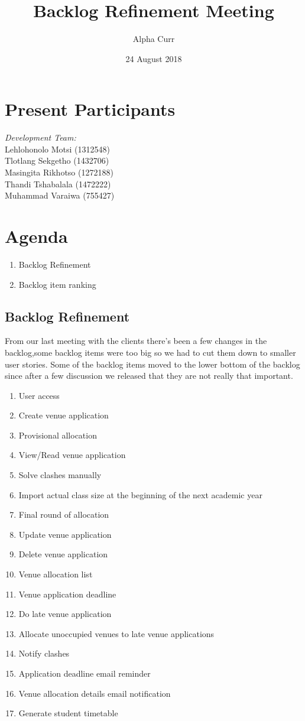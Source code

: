 \documentclass[11pt]{article}
\title{Backlog Refinement Meeting}
\author{Alpha Curr}
\date{24 August 2018}
\begin{document}
\maketitle

\section{Present Participants}
\textit{Development Team:}\\
Lehlohonolo Motsi (1312548)\\
Tlotlang Sekgetho (1432706)\\
Masingita Rikhotso (1272188)\\
Thandi Tshabalala (1472222)\\
Muhammad Varaiwa (755427)

\section{Agenda}
\begin{enumerate}
\item Backlog Refinement
\item Backlog item ranking
\end{enumerate}

\subsection{Backlog Refinement}
From our last meeting with the clients there's been a few changes in the backlog,some backlog items were too big so we had to cut them down to smaller user stories. Some of the backlog items moved to the lower bottom of the backlog since after a few discussion we released that they are not really that important.\\
\begin{enumerate}
	\item User access
	\item Create venue application
	\item Provisional allocation
	\item View/Read venue application
	\item Solve clashes manually
	\item Import actual class size at the beginning of the next academic year
	\item Final round of allocation
	\item Update venue application
	\item Delete venue application
	\item Venue allocation list
	\item Venue application deadline
	\item Do late venue application
	\item Allocate unoccupied venues to late venue applications
	\item Notify clashes
	\item Application deadline email reminder
	\item Venue allocation details email notification
	\item Generate student timetable
\end{enumerate}
\end{document}
